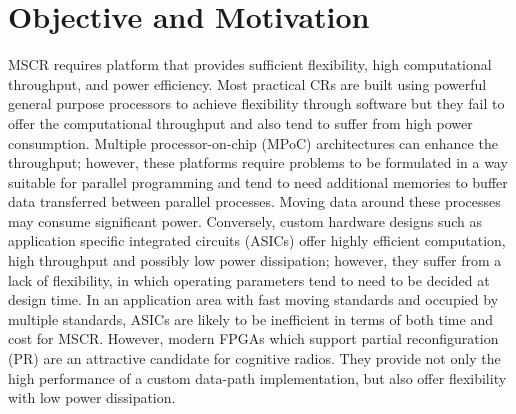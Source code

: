 \section{Objective and Motivation}

MSCR requires platform that provides sufficient flexibility, high computational throughput, and power efficiency.
Most practical CRs are built using powerful general purpose processors to achieve flexibility through software but they fail to offer the computational throughput and also tend to suffer from high power consumption.
Multiple processor-on-chip (MPoC) architectures can enhance the throughput;
however, these platforms require problems to be formulated in a way suitable for parallel programming and tend to need additional memories to buffer data transferred between parallel processes.
Moving data around these processes may consume significant power.
Conversely, custom hardware designs such as application specific integrated circuits (ASICs) offer highly efficient computation, high throughput and possibly low power dissipation; however, they suffer from a lack of flexibility, in which operating parameters tend to need to be decided at design time.
In an application area with fast moving standards and occupied by multiple standards, ASICs are likely to be inefficient in terms of both time and cost for MSCR.
However, modern FPGAs which support partial reconfiguration (PR) are an attractive candidate for cognitive radios.
They provide not only the high performance of a custom data-path implementation, but also offer flexibility with low power dissipation.

